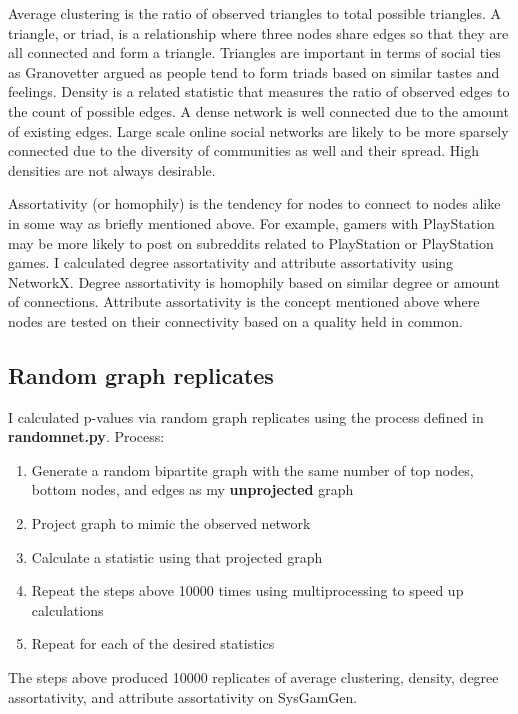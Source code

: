 \documentclass[12pt, a4paper]{article}
\begin{document}
Average clustering is the ratio of observed triangles to total possible triangles. A triangle, or triad, is a relationship where three nodes share edges so that they are all connected and form a triangle. Triangles are important in terms of social ties as Granovetter argued as people tend to form triads based on similar tastes and feelings. Density is a related statistic that measures the ratio of observed edges to the count of possible edges. A dense network is well connected due to the amount of existing edges. Large scale online social networks are likely to be more sparsely connected due to the diversity of communities as well and their spread. High densities are not always desirable.

Assortativity (or homophily) is the tendency for nodes to connect to nodes alike in some way as briefly mentioned above. For example, gamers with PlayStation may be more likely to post on subreddits related to PlayStation or PlayStation games. I calculated degree assortativity and attribute assortativity using NetworkX. Degree assortativity is homophily based on similar degree or amount of connections. Attribute assortativity is the concept mentioned above where nodes are tested on their connectivity based on a quality held in common.

\subsection{Random graph replicates}

I calculated p-values via random graph replicates using the process defined in \textbf{randomnet.py}. Process:

\begin{enumerate}
  \item Generate a random bipartite graph with the same number of top nodes, bottom nodes, and edges as my \textbf{unprojected} graph
  \item Project graph to mimic the observed network
  \item Calculate a statistic using that projected graph
  \item Repeat the steps above 10000 times using multiprocessing to speed up calculations
  \item Repeat for each of the desired statistics
\end{enumerate}

The steps above produced 10000 replicates of average clustering, density, degree assortativity, and attribute assortativity on SysGamGen.
\end{document}
